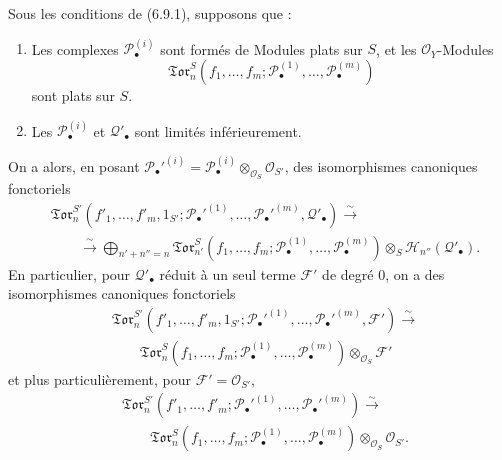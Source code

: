 \begin{corollary}[6.9.6]
Sous les conditions de \textup{(6.9.1)}, supposons que :
\begin{enumerate}
  \item[$1^\circ$] Les complexes $\mathscr P_\bullet^{(i)}$ sont formés de
  Modules plats sur $S$, et les $\mathscr O_Y$-Modules
  \[
    \mathfrak{Tor}_n^S
    (f_1,\ldots,f_m;
     \mathscr P_\bullet^{(1)},\ldots,\mathscr P_\bullet^{(m)})
  \]
  sont plats sur $S$.
  \item[$2^\circ$] Les $\mathscr P_\bullet^{(i)}$ et
  $\mathscr Q'_\bullet$ sont limités inférieurement.
\end{enumerate}

On a alors, en posant
$\mathscr P_\bullet'^{(i)}=
\mathscr P_\bullet^{(i)}\otimes_{\mathscr O_S}\mathscr O_{S'}$, des
isomorphismes canoniques fonctoriels
\[
\begin{split}
  &\mathfrak{Tor}_n^{S'}
  (f'_1,\ldots,f'_m,1_{S'};
   \mathscr P_\bullet'^{(1)},\ldots,
   \mathscr P_\bullet'^{(m)},\mathscr Q'_\bullet)
  \xrightarrow{\sim}\\
  &\qquad\xrightarrow{\sim}
  \bigoplus_{n'+n''=n}
  \mathfrak{Tor}_{n'}^S
  (f_1,\ldots,f_m;
   \mathscr P_\bullet^{(1)},\ldots,
   \mathscr P_\bullet^{(m)})
  \otimes_S\mathscr H_{n''}(\mathscr Q'_\bullet).
\end{split}
\tag{6.9.6.1}\label{III.6.9.6.1.fr}
\]
En particulier, pour $\mathscr Q'_\bullet$ réduit à un seul terme
$\mathscr F'$ de degré $0$, on a des isomorphismes canoniques fonctoriels
\[
\begin{split}
  &\mathfrak{Tor}_n^{S'}
  (f'_1,\ldots,f'_m,1_{S'};
   \mathscr P_\bullet'^{(1)},\ldots,
   \mathscr P_\bullet'^{(m)},\mathscr F')
  \xrightarrow{\sim}\\
  &\qquad
  \mathfrak{Tor}_n^S
  (f_1,\ldots,f_m;
   \mathscr P_\bullet^{(1)},\ldots,
   \mathscr P_\bullet^{(m)})
  \otimes_{\mathscr O_S}\mathscr F'
\end{split}
\tag{6.9.6.2}\label{III.6.9.6.2.fr}
\]
et plus particulièrement, pour $\mathscr F'=\mathscr O_{S'}$,
\[
\begin{split}
  &\mathfrak{Tor}_n^{S'}
  (f'_1,\ldots,f'_m;
   \mathscr P_\bullet'^{(1)},\ldots,
   \mathscr P_\bullet'^{(m)})
  \xrightarrow{\sim}\\
  &\qquad
  \mathfrak{Tor}_n^S
  (f_1,\ldots,f_m;
   \mathscr P_\bullet^{(1)},\ldots,
   \mathscr P_\bullet^{(m)})
  \otimes_{\mathscr O_S}\mathscr O_{S'}.
\end{split}
\tag{6.9.6.3}\label{III.6.9.6.3.fr}
\]
\end{corollary}

